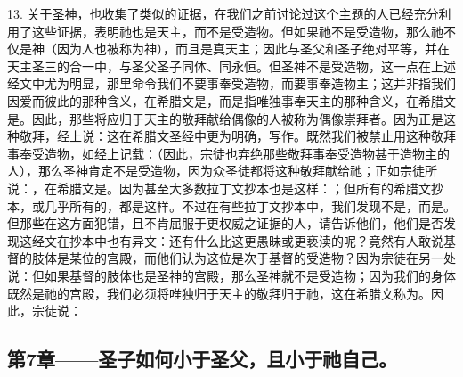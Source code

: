 13. 关于圣神，也收集了类似的证据，在我们之前讨论过这个主题的人已经充分利用了这些证据，表明祂也是天主，而不是受造物。但如果祂不是受造物，那么祂不仅是神（因为人也被称为神），而且是真天主；因此与圣父和圣子绝对平等，并在天主圣三的合一中，与圣父圣子同体、同永恒。但圣神不是受造物，这一点在上述经文中尤为明显，那里命令我们不要事奉受造物，而要事奉造物主；这并非指我们因爱而彼此的那种含义，在希腊文是，而是指唯独事奉天主的那种含义，在希腊文是。因此，那些将应归于天主的敬拜献给偶像的人被称为偶像崇拜者。因为正是这种敬拜，经上说：这在希腊文圣经中更为明确，写作。既然我们被禁止用这种敬拜事奉受造物，如经上记载：（因此，宗徒也弃绝那些敬拜事奉受造物甚于造物主的人），那么圣神肯定不是受造物，因为众圣徒都将这种敬拜献给祂；正如宗徒所说：，在希腊文是。因为甚至大多数拉丁文抄本也是这样：；但所有的希腊文抄本，或几乎所有的，都是这样。不过在有些拉丁文抄本中，我们发现不是，而是。但那些在这方面犯错，且不肯屈服于更权威之证据的人，请告诉他们，他们是否发现这经文在抄本中也有异文：还有什么比这更愚昧或更亵渎的呢？竟然有人敢说基督的肢体是某位的宫殿，而他们认为这位是次于基督的受造物？因为宗徒在另一处说：但如果基督的肢体也是圣神的宫殿，那么圣神就不是受造物；因为我们的身体既然是祂的宫殿，我们必须将唯独归于天主的敬拜归于祂，这在希腊文称为。因此，宗徒说：\par


\subsection{第7章——圣子如何小于圣父，且小于祂自己。}

